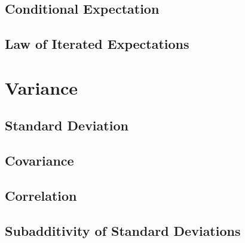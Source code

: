 \documentclass[11pt]{report} %
\begin{document}
\subsection{Conditional Expectation}

\subsection{Law of Iterated Expectations}

\section{Variance}

\subsection{Standard Deviation}

\subsection{Covariance}

\subsection{Correlation}

\subsection{Subadditivity of Standard Deviations}
\end{document}
